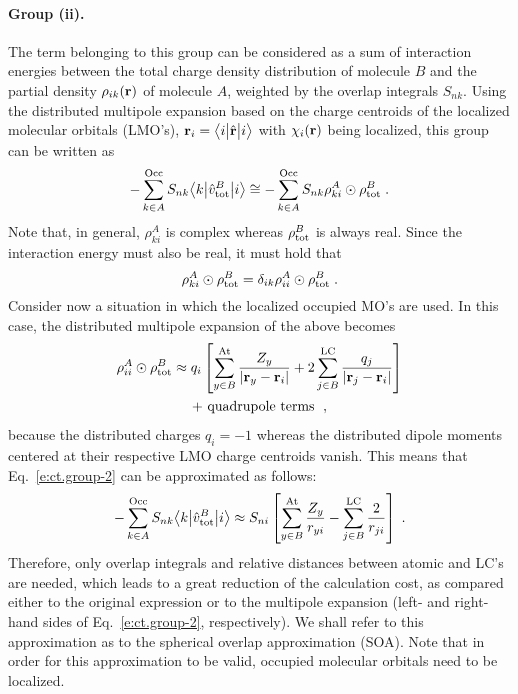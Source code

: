 \paragraph{Group (ii).}
The term belonging to this group can be considered as a sum of interaction
energies between the total charge density distribution of molecule $B$
and the partial density $\rho_{ik}({\bf r})$ of molecule $A$,
weighted by the overlap integrals $S_{nk}$. Using the distributed multipole 
expansion based on the charge centroids of the localized molecular orbitals (LMO's),
${\bf r}_i = \bigl\langle {i} \bigl\lvert {\hat{\bf r}} \bigl\lvert {i} \bigr\rangle$ with $\chi_i({\bf r})$ being localized,
this group can be written as
%
\begin{equation} \label{e:ct.group-2}
      - \sum_{k\in A}^{\rm Occ} S_{nk}  \bigl\langle {k} \bigl\lvert {\hat{v}^B_{\rm tot} } \bigl\lvert {i} \bigr\rangle 
 \cong - \sum_{k\in A}^{\rm Occ} S_{nk} \rho_{ki}^A \odot \rho^B_{\rm tot} \;.
\end{equation}
%
Note that, in general, $\rho_{ki}^A$ is complex whereas $\rho^B_{\rm tot}$ is always real.
Since the interaction energy must also be real, it must hold that
%
\begin{equation} \label{e:ct.group-2-d}
 \rho_{ki}^A \odot \rho^B_{\rm tot} = \delta_{ik} \rho_{ii}^A \odot \rho^B_{\rm tot} \;.
\end{equation}
%
Consider now a situation in which the localized occupied MO's are used.
In this case, the distributed multipole expansion
of the above becomes
%
\begin{multline}
 \rho_{ii}^A \odot \rho^B_{\rm tot} 
 \approx 
 q_{i} 
 \left[
 \sum_{y\in B}^{\rm At}
  \frac{Z_y}{\vert {\bf r}_y - {\bf r}_i \vert } 
 +
 2\sum_{j\in B}^{\rm LC}
  \frac{q_j}{\vert {\bf r}_j - {\bf r}_i \vert } 
 \right] \\
 + \text{ quadrupole terms } \;,
\end{multline}
%
because the distributed charges
$q_i = -1$ whereas the distributed dipole moments %
centered at their
respective LMO charge centroids vanish.\cite{Etchebest.Lavery.Pullman.TheorChimActa.1982}
This means that Eq.~\eqref{e:ct.group-2} can be approximated as follows:
%
\begin{equation} \label{e:ct.group-ii.final}
      - \sum_{k\in A}^{\rm Occ} S_{nk} \bigl\langle {k} \bigl\lvert {\hat{v}^B_{\rm tot} } \bigl\lvert {i} \bigr\rangle 
 \approx S_{ni}  \left[
 \sum_{y\in B}^{\rm At}
  \frac{Z_y}{ r_{yi} } 
 -
 \sum_{j\in B}^{\rm LC}
  \frac{2}{r_{ji}} 
 \right] \;.
\end{equation}
%
Therefore, only overlap integrals and relative distances between
atomic and LC's are needed, which leads to a great reduction of the
calculation cost,
as compared either to the original expression or to the multipole expansion (left\hyp{} and right\hyp{}hand sides
of Eq.~\eqref{e:ct.group-2}, respectively).
We shall refer to this approximation as to
the spherical overlap approximation (SOA). Note that in order for this approximation to be valid,
occupied molecular orbitals need to be localized.

